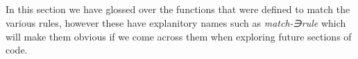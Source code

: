 {\begin{code}
\AgdaSymbol{(}\AgdaSpace{}%
\AgdaSymbol{)}\<%
\\
%
\>[25]\AgdaSpace{}%
\AgdaSpace{}%
\AgdaSpace{}%
\AgdaSpace{}%
\AgdaSymbol{(}\AgdaSpace{}%
\AgdaSymbol{)}\<%
\\
%
\>[25]\AgdaSpace{}%
\AgdaSymbol{(}\AgdaSpace{}%
\AgdaOperator{\AgdaInductiveConstructor{,}}\AgdaSpace{}%
\AgdaSymbol{)}\<%
\\
\>[.][@{}l@{}]\<[1944I]%
\>[23]\<%
\\
\>[23][@{}l@{\AgdaIndent{0}}]%
\>[25]\AgdaSpace{}%
\<%
\end{code}
}
In this section we have glossed over the functions that were defined to match the
various rules, however these have explanitory names such as \emph{match-∋rule} which
will make them obvious if we come across them when exploring future sections of
code.
